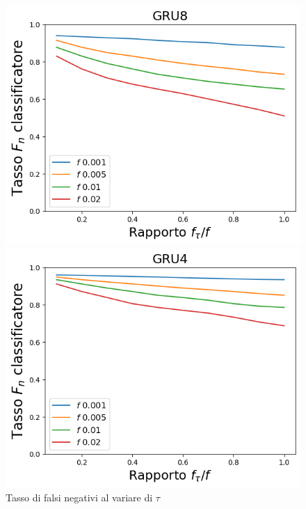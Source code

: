 \documentclass{beamer}
\begin{document}
\begin{frame}
\begin{figure}[htbp]
\begin{minipage}{0.25\textwidth}
    \includegraphics[width=\textwidth]{immagini/7/LBF/GRU8_FNR.png}
    \end{minipage}%
    \hfill
    \begin{minipage}{0.25\textwidth}
    \centering
    \includegraphics[width=\textwidth]{immagini/7/LBF/GRU4_FNR.png}
    \end{minipage}%
    \hfill

    \begin{minipage}[t]{\textwidth}
    \centering
    \caption{Tasso di falsi negativi al variare di $\tau$}
    \end{minipage}%
\end{figure}
\end{frame}
\end{document}
